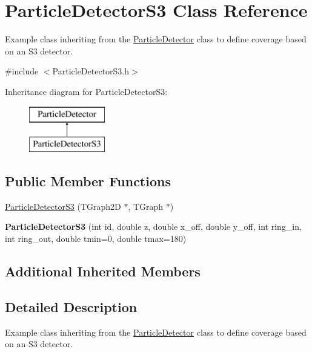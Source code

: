 \hypertarget{classParticleDetectorS3}{\section{Particle\-Detector\-S3 Class Reference}
\label{classParticleDetectorS3}
}


Example class inheriting from the \hyperlink{classParticleDetector}{Particle\-Detector} class to define coverage based on an S3 detector.  




{\ttfamily \#include $<$Particle\-Detector\-S3.\-h$>$}

Inheritance diagram for Particle\-Detector\-S3\-:\begin{figure}[H]
\begin{center}
\leavevmode
\includegraphics[height=2.000000cm]{classParticleDetectorS3}
\end{center}
\end{figure}
\subsection*{Public Member Functions}
\begin{DoxyCompactItemize}
\item 
\hyperlink{classParticleDetectorS3_a0da9b3baef00144759ca90a177e69cdc}{Particle\-Detector\-S3} (T\-Graph2\-D $\ast$, T\-Graph $\ast$)
\item 
\hypertarget{classParticleDetectorS3_a002873e132856865a40151e976974ad6}{{\bfseries Particle\-Detector\-S3} (int id, double z, double x\-\_\-off, double y\-\_\-off, int ring\-\_\-in, int ring\-\_\-out, double tmin=0, double tmax=180)}\label{classParticleDetectorS3_a002873e132856865a40151e976974ad6}

\end{DoxyCompactItemize}
\subsection*{Additional Inherited Members}


\subsection{Detailed Description}
Example class inheriting from the \hyperlink{classParticleDetector}{Particle\-Detector} class to define coverage based on an S3 detector. 

